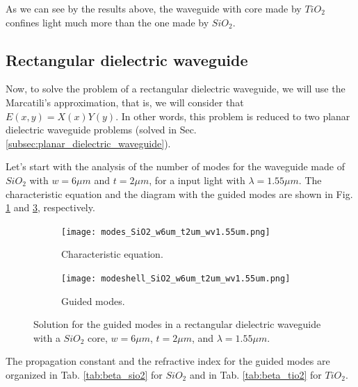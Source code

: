 \documentclass[a4paper,12pt]{article}
\begin{document}
As we can see by the results above, the waveguide with core made by $TiO_2$ confines light much more than the one made by $SiO_2$. 

\subsection{Rectangular dielectric waveguide}
\label{subsec:rectangular_dielectric_waveguide}
    
Now, to solve the problem of a rectangular dielectric waveguide, we will use the Marcatili's approximation, that is, we will consider that $E(x, y) = X(x)Y(y)$. In other words, this problem is reduced to two planar dielectric waveguide problems (solved in Sec. \ref{subsec:planar_dielectric_waveguide}).

Let's start with the analysis of the number of modes for the waveguide made of $SiO_2$ with $w = 6\mu m$ and $t = 2\mu m$, for a input light with $\lambda = 1.55\mu m$. The characteristic equation and the diagram with the guided modes are shown in Fig. \ref{fig:char_eq2} and \ref{fig:shell_modes2}, respectively.

\begin{figure}[H]
    \centering
    \begin{subfigure}{0.45\textwidth}
        \centering
        \texttt{[image: modes\_SiO2\_w6um\_t2um\_wv1.55um.png]}
        \caption{Characteristic equation.}
        \label{fig:char_eq2}
    \end{subfigure}
    \hfill
    \begin{subfigure}{0.45\textwidth}
        \centering
        \texttt{[image: modeshell\_SiO2\_w6um\_t2um\_wv1.55um.png]}
        \caption{Guided modes.}
        \label{fig:shell_modes2}
    \end{subfigure}
    \caption{Solution for the guided modes in a rectangular dielectric waveguide with a $SiO_2$ core, $w = 6 \mu m$, $t = 2\mu m$, and $\lambda = 1.55 \mu m$.}
\end{figure}

The propagation constant and the refractive index for the guided modes are organized in Tab. \ref{tab:beta_sio2} for $SiO_2$ and in Tab. \ref{tab:beta_tio2} for $TiO_2$.
\end{document}
